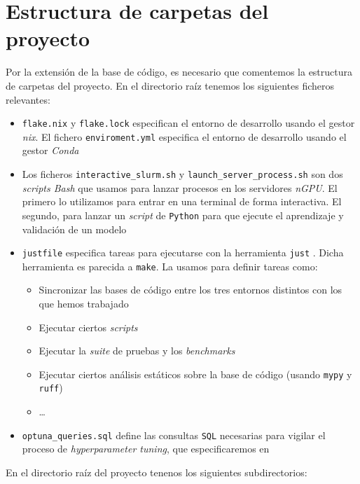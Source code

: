 \section{Estructura de carpetas del proyecto} \label{isec:estructura_carpetas}

Por la extensión de la base de código, es necesario que comentemos la estructura de carpetas del proyecto. En el directorio raíz tenemos los siguientes ficheros relevantes:

\begin{itemize}
    \item \lstinline{flake.nix} y \lstinline{flake.lock} especifican el entorno de desarrollo usando el gestor \textit{nix}. El fichero \lstinline{enviroment.yml} especifica el entorno de desarrollo usando el gestor \textit{Conda}
    \item Los ficheros \lstinline{interactive_slurm.sh} y \lstinline{launch_server_process.sh} son dos \textit{scripts Bash} que usamos para lanzar procesos en los servidores \textit{nGPU}. El primero lo utilizamos para entrar en una terminal de forma interactiva. El segundo, para lanzar un \textit{script} de \lstinline{Python} para que ejecute el aprendizaje y validación de un modelo
    \item \lstinline{justfile} especifica tareas para ejecutarse con la herramienta \lstinline{just} \cite{informatica:just}. Dicha herramienta es parecida a \lstinline{make}. La usamos para definir tareas como:
        \begin{itemize}
            \item Sincronizar las bases de código entre los tres entornos distintos con los que hemos trabajado
            \item Ejecutar ciertos \textit{scripts}
            \item Ejecutar la \textit{suite} de pruebas y los \textit{benchmarks}
            \item Ejecutar ciertos análisis estáticos sobre la base de código (usando \lstinline{mypy} y \lstinline{ruff})
            \item \ldots
        \end{itemize}
    \item \lstinline{optuna_queries.sql} define las consultas \lstinline{SQL} necesarias para vigilar el proceso de \textit{hyperparameter tuning}, que especificaremos en 
\end{itemize}

En el directorio raíz del proyecto tenenos los siguientes subdirectorios:

